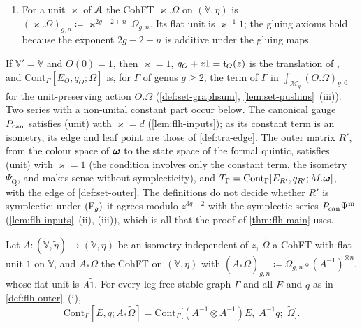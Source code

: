 \begin{defn}
\begin{enumerate}
\[
\text{(unit)}\qquad O_0^{-1}1'=\varkappa^{-1}1\quad\text{for a unit }\varkappa\text{ of }\cA .
\]
The edge and the leaf point of $O$ are
\[
E_O(\psi,\psi')\coloneqq\frac{\eta^{-1}-\bigl(O^{-1}(\psi)\otimes O^{-1}(\psi')\bigr)\eta'^{-1}}{\psi+\psi'},\qquad q_O(z)\coloneqq O^{-1}(z)(-z1'),
\]
where $\eta^{-1}\in\mathbb V\otimes\mathbb V$ and $\eta'^{-1}\in\mathbb V'\otimes\mathbb V'$ are the inverse bivectors. By symplecticity the numerator vanishes at $\psi'=-\psi$, so $E_O$ is a power series in $\psi,\psi'$, symmetric in the sense of (i) \cite[Rem.~2.1 and (6)]{PPZ15}; by (unit), $q_O\in-z\varkappa^{-1}1+z^2\mathbb V\fps{z}$.
\item For a unit $\varkappa$ of $\mathcal{A}$ the CohFT $\varkappa.\Omega$ on $(\mathbb V,\eta)$ is $(\varkappa.\Omega)_{g,n}\coloneqq\varkappa^{2g-2+n}\,\Omega_{g,n}$. Its flat unit is $\varkappa^{-1}1$; the gluing axioms hold because the exponent $2g-2+n$ is additive under the gluing maps.
\end{enumerate}
\end{defn}

If $\mathbb V'=\mathbb V$ and $O(0)=1$, then $\varkappa=1$, $q_O+z1=\mathfrak{t}_O(z)$ is the translation of \cite[Def.~2.13]{PPZ15}, and $\mathrm{Cont}_\Gamma[E_O,q_O;\Omega]$ is, for $\Gamma$ of genus $g\geq2$, the term of $\Gamma$ in $\int_{\overline{\mathcal M}_g}(O.\Omega)_{g,0}$ for the unit-preserving action $O.\Omega$ (\cref{def:set-graphsum}, \cref{lem:set-pushins}~(iii)). Two series with a non-unital constant part occur below. The canonical gauge $P_{\mathrm{can}}$ satisfies (unit) with $\varkappa=d$ (\cref{lem:flh-inputs}); as its constant term is an isometry, its edge and leaf point are those of \cref{def:tra-edge}. The outer matrix $R'$, from the colour space of $\boldsymbol{\omega}$ to the state space of the formal quintic, satisfies (unit) with $\varkappa=1$ (the condition involves only the constant term, the isometry $\Psi_{\mathrm Q}$, and makes sense without symplecticity), and $T_\Gamma=\mathrm{Cont}_\Gamma[E_{R'},q_{R'};M.\boldsymbol{\omega}]$, with the edge of \cref{def:set-outer}. The definitions do not decide whether $R'$ is symplectic; under $(\mathrm{F}_{g})$ it agrees modulo $z^{3g-2}$ with the symplectic series $P_{\mathrm{can}}\Psi^{\mathrm m}$ (\cref{lem:flh-inputs}~(ii), (iii)), which is all that the proof of \cref{thm:flh-main} uses.

\begin{lem}
\label{lem:flh-frame}
Let $A\colon(\widetilde{\mathbb V},\tilde\eta)\to(\mathbb V,\eta)$ be an isometry independent of $z$, $\widetilde\Omega$ a CohFT with flat unit $\tilde 1$ on $\widetilde{\mathbb V}$, and $A_*\widetilde\Omega$ the CohFT on $(\mathbb V,\eta)$ with $(A_*\widetilde\Omega)_{g,n}\coloneqq\widetilde\Omega_{g,n}\circ(A^{-1})^{\otimes n}$, whose flat unit is $A\tilde1$. For every leg-free stable graph $\Gamma$ and all $E$ and $q$ as in \cref{def:flh-outer}~(i),
\[
\mathrm{Cont}_\Gamma[E,q;A_*\widetilde\Omega]=\mathrm{Cont}_\Gamma\bigl[(A^{-1}\otimes A^{-1})E,\;A^{-1}q;\;\widetilde\Omega\bigr].
\]
\end{lem}

